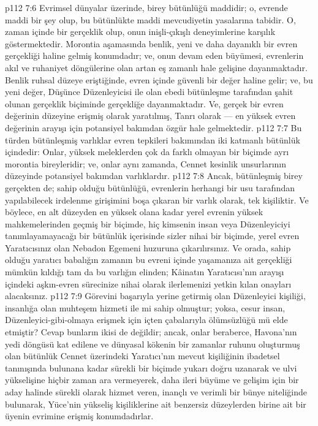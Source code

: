 \vs p112 7:6 Evrimsel dünyalar üzerinde, birey bütünlüğü maddidir; o, evrende maddi bir şey olup, bu bütünlükte maddi mevcudiyetin yasalarına tabidir. O, zaman içinde bir gerçeklik olup, onun inişli\hyp{}çıkışlı deneyimlerine karşılık göstermektedir.  Morontia aşamasında benlik, yeni ve daha dayanıklı bir evren gerçekliği haline gelmiş konumdadır; ve, onun devam eden büyümesi, evrenlerin akıl ve ruhaniyet döngülerine olan artan eş zamanlı hale gelişine dayanmaktadır.  Benlik ruhsal düzeye eriştiğinde, evren içinde güvenli bir değer haline gelir; ve, bu yeni değer, Düşünce Düzenleyicisi ile olan ebedi bütünleşme tarafından şahit olunan gerçeklik biçiminde gerçekliğe dayanmaktadır. Ve, gerçek bir evren değerinin düzeyine erişmiş olarak yaratılmış, Tanrı olarak --- en yüksek evren değerinin arayışı için potansiyel bakımdan özgür hale gelmektedir.
\vs p112 7:7 Bu türden bütünleşmiş varlıklar evren tepkileri bakımından iki katmanlı bütünlük içindedir: Onlar, yüksek meleklerden çok da farklı olmayan bir biçimde ayrı morontia bireyleridir; ve, onlar aynı zamanda, Cennet kesinlik unsurlarının düzeyinde potansiyel bakımdan varlıklardır.
\vs p112 7:8 Ancak, bütünleşmiş birey gerçekten de; sahip olduğu bütünlüğü, evrenlerin herhangi bir usu tarafından yapılabilecek irdelenme girişimini boşa çıkaran bir varlık olarak, tek kişiliktir. Ve böylece, en alt düzeyden en yüksek olana kadar yerel evrenin yüksek mahkemelerinden geçmiş bir biçimde, hiç kimsenin insan veya Düzenleyiciyi tanımlayamayacağı bir bütünlük içerisinde sizler nihai bir biçimde, yerel evren Yaratıcısınız olan Nebadon Egemeni huzuruna çıkarılırsınız. Ve orada, sahip olduğu yaratıcı babalığın zamanın bu evreni içinde yaşamanıza ait gerçekliği mümkün kıldığı tam da bu varlığın elinden; Kâinatın Yaratıcısı’nın arayışı içindeki aşkın\hyp{}evren sürecinize nihai olarak ilerlemenizi yetkin kılan onayları alacaksınız.
\vs p112 7:9 Görevini başarıyla yerine getirmiş olan Düzenleyici kişiliği, insanlığa olan muhteşem hizmeti ile mi sahip olmuştur; yoksa, cesur insan, Düzenleyici\hyp{}gibi\hyp{}olmaya erişmek için içten çabalarıyla ölümsüzlüğü mü elde etmiştir? Cevap bunların ikisi de değildir; ancak, onlar beraberce, Havona’nın yedi döngüsü kat edilene ve dünyasal kökenin bir zamanlar ruhunu oluşturmuş olan bütünlük Cennet üzerindeki Yaratıcı’nın mevcut kişiliğinin ibadetsel tanınışında bulunana kadar sürekli bir biçimde yukarı doğru uzanarak ve ulvi yükselişine hiçbir zaman ara vermeyerek, daha ileri büyüme ve gelişim için bir aday halinde sürekli olarak hizmet veren, inançlı ve verimli bir bünye niteliğinde bulunarak, Yüce’nin yükseliş kişiliklerine ait benzersiz düzeylerden birine ait bir üyenin evrimine erişmiş konumdadırlar.
